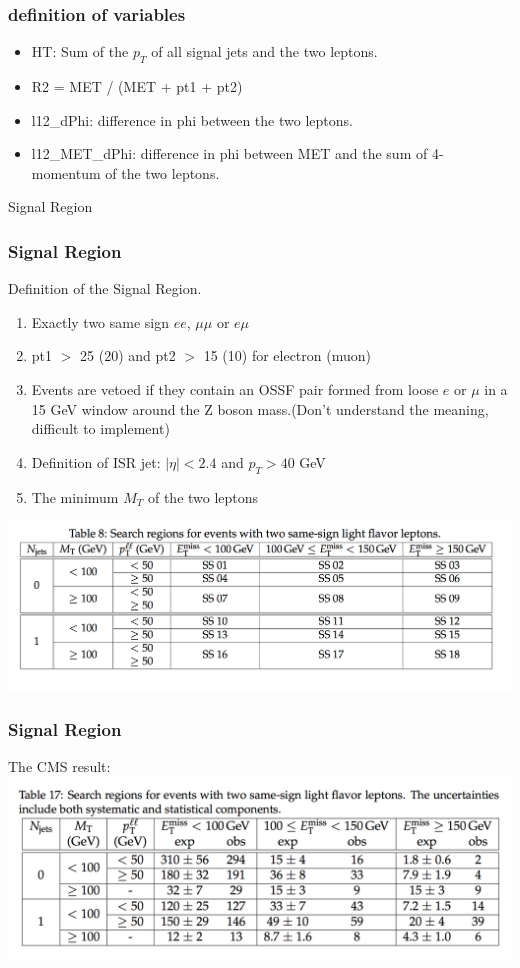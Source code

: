 \documentclass[mathserif,serif]{beamer}
\begin{document}
\begin{frame}
\frametitle{definition of variables}
\normalsize
\begin{itemize}
\item HT: Sum of the $p_T$ of all signal jets and the two leptons.
\item R2 = MET / (MET + pt1 + pt2)
\item l12\_dPhi: difference in phi between the two leptons.
\item l12\_MET\_dPhi: difference in phi between MET and the sum of 4-momentum of the two leptons.
\end{itemize}
\end{frame}

\begin{frame}
\begin{center}
\huge
Signal Region
\end{center}
\end{frame}

\begin{frame}
\frametitle{Signal Region}
Definition of the Signal Region.
\begin{enumerate}
\item Exactly two same sign $ee$, $\mu\mu$ or $e\mu$
\item pt1 $>$ 25 (20) and pt2 $>$ 15 (10) for electron (muon)
\item Events are vetoed if they contain an OSSF pair formed from loose $e$ or $\mu$ in a 15 GeV window around the Z boson mass.(Don't understand the meaning, difficult to implement)
\item Definition of ISR jet: $|\eta| < 2.4$ and $p_T > 40$ GeV
\item The minimum $M_T$ of the two leptons
\end{enumerate}
\includegraphics[width=1\textwidth]{data/photo/SR.png}
\end{frame}

\begin{frame}
\frametitle{Signal Region}
The CMS result:
\includegraphics[width=1\textwidth]{data/photo/result.png}
\end{frame}
\end{document}

